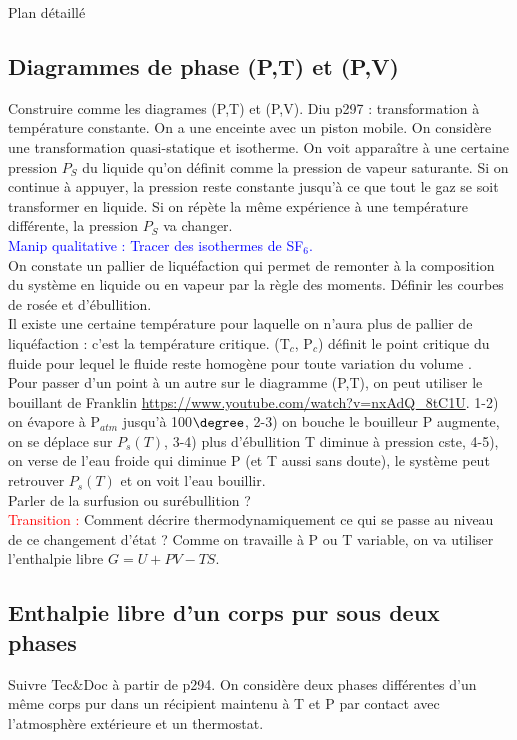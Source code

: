 \begin{reportBlock}{Plan détaillé}
  \subsection{Diagrammes de phase (P,T) et (P,V)}
  Construire comme les diagrames (P,T) et (P,V).  Diu p297 : transformation à température constante. On a une enceinte avec un piston mobile. On considère une transformation quasi-statique et isotherme. On voit apparaître à une certaine pression $P_S$ du liquide qu'on définit comme la pression de vapeur saturante. Si on continue à appuyer, la pression reste constante jusqu'à ce que tout le gaz se soit transformer en liquide. Si on répète la même expérience à une température différente, la pression $P_S$ va changer. \\
  \textcolor{blue}{Manip qualitative : Tracer des isothermes de SF$_6$.}\\
  
  On constate un pallier de liquéfaction qui permet de remonter à la composition du système en liquide ou en vapeur par la règle des moments. Définir les courbes de rosée et d'ébullition.\\

  Il existe une certaine température pour laquelle on n'aura plus de pallier de liquéfaction : c'est la température critique. (T$_c$, P$_c$) définit le point critique du fluide pour lequel le fluide reste homogène pour toute variation du volume .\\

  Pour passer d'un point à un autre sur le diagramme (P,T), on peut utiliser le bouillant de Franklin \url{https://www.youtube.com/watch?v=nxAdQ_8tC1U}. 1-2) on évapore à P$_{atm}$  jusqu'à 100$\degree$, 2-3) on bouche le bouilleur P augmente, on se déplace sur $P_s(T)$, 3-4) plus d'ébullition T diminue à pression cste, 4-5), on verse de l'eau froide qui diminue P (et T aussi sans doute), le système peut retrouver $P_s(T)$ et on voit l'eau bouillir.\\

  Parler de la surfusion ou surébullition ?\\
  
  \textcolor{red}{Transition : } Comment décrire thermodynamiquement ce qui se passe au niveau de ce changement d'état ? Comme on travaille à P ou T variable, on va utiliser l'enthalpie libre $G = U+PV-TS$.
  
  \subsection{Enthalpie libre d'un corps pur sous deux phases}
  Suivre Tec\&Doc à partir de p294. On considère deux phases différentes d'un même corps pur dans un récipient maintenu à T et P par contact avec l'atmosphère extérieure et un thermostat.\\
  

\end{reportBlock}

